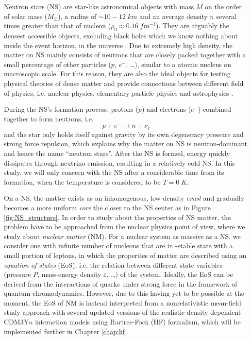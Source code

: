 
Neutron stars (\gls{NS}) are star-like astronomical objects with mass $M$ on the order of solar mass ($M_\odot$), a radius of $\sim 10-12\;km$ and an average density $n$ several times greater than that of nucleon ($\rho_0 \approx 0.16\;fm^{-3}$). They are arguably the densest accessible objects, excluding black holes which we know nothing about inside the event horizon, in the universe \cite{baym1975neutron}. Due to extremely high density, the matter on \gls{NS} mainly consists of neutrons that are closely packed together with a small percentage of other particles ($p$, $e^-$, \ldots), similar to a atomic nucleus on macroscopic scale. For this reason, they are also the ideal objects for testing physical theories of dense matter and provide connections between different field of physics, i.e. nuclear physics, elementary particle physics and astrophysics \cite{lattimer2004physics}.\par
During the \gls{NS}'s formation process, protons ($p$) and electrons ($e^-$) combined together to form neutrons, i.e.
\begin{equation}
        p + e^- \longrightarrow n + \nu_e
\end{equation}
and the star only holds itself against gravity by its own degeneracy pressure and strong force repulsion, which explains why the matter on \gls{NS} is neutron-dominant and hence the name ``neutron stars''. After the \gls{NS} is formed, energy quickly dissipates through neutrino emission, resulting in a relatively cold \gls{NS}. In this study, we will only concern with the \gls{NS} after a considerable time from its formation, when the temperature is considered to be $T=0\;K$.\par
On a \gls{NS}, the matter exists as an inhomogenous, low-density \emph{crust} and gradually becomes a more uniform \emph{core} the closer to the \gls{NS} center as in Figure \ref{fig:NS_structure}. In order to study about the properties of \gls{NS} matter, the problem have to be approached from the nuclear physics point of view, where we study about \emph{nuclear matter} (\gls{NM}). For a nuclear system as massive as a \gls{NS}, we consider one with infinite number of nucleons that are in \textbeta-stable state with a small portion of leptons, in which the properties of matter are described using an \emph{equation of states} (\gls{EoS}), i.e. the relation between different state variables (pressure $P$, mass-energy density $\varepsilon$, \ldots) of the system. Ideally, the \gls{EoS} can be derived from the interactions of quarks under strong force in the framework of quantum chromodynamics. However, due to this having yet to be possible at the moment, the \gls{EoS} of \gls{NM} is instead interpreted from a nonrelativistic mean-field study approach with several updated versions of the realistic density-dependent CDM3Y$n$ interaction models \cite{khoa1995equation,khoa2007mean} using Hartree-Fock (\gls{HF}) formalism, which will be implemented further in Chapter \ref{chap:hf}.

